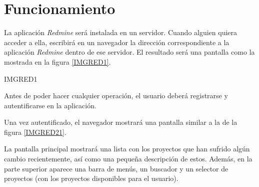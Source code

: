 \documentclass[11pt,a4paper,spanish,twoside]{report}
\begin{document}
\section{Funcionamiento}
La aplicación \emph{Redmine} será instalada en un servidor. Cuando alguien
quiera acceder a ella, escribirá en un navegador la dirección
correspondiente a la aplicación \emph{Redmine} dentro de ese servidor. El
resultado será una pantalla como la mostrada en la figura \ref{IMGRED1}.
		
{IMGRED1}

Antes de poder hacer cualquier operación, el usuario deberá registrarse y
autentificarse en la aplicación.

Una vez autentificado, el navegador mostrará una pantalla similar a la de la
figura \ref{IMGRED21}.


La pantalla principal mostrará una lista con los proyectos que han sufrido
algún cambio recientemente, así como una pequeña descripción de estos. Además,
en la parte superior aparece una barra de menús, un buscador y un selector
de proyectos (con los proyectos disponibles para el usuario).
\end{document}

